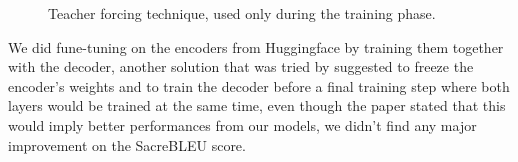 \begin{figure}[H]
    \centering
    \qquad \qquad
    \caption{Teacher forcing technique, used only during the training phase.}
    \label{fig:teacher_forcing}
\end{figure}
We did fune-tuning on the encoders from Huggingface by training them together with the decoder, another solution that was tried by \cite{imamura-sumita-2019-recycling} suggested to freeze the encoder's weights and to train the decoder before a final training step where both layers would be trained at the same time, even though the paper stated that this would imply better performances from our models, we didn't find any major improvement on the SacreBLEU score.

